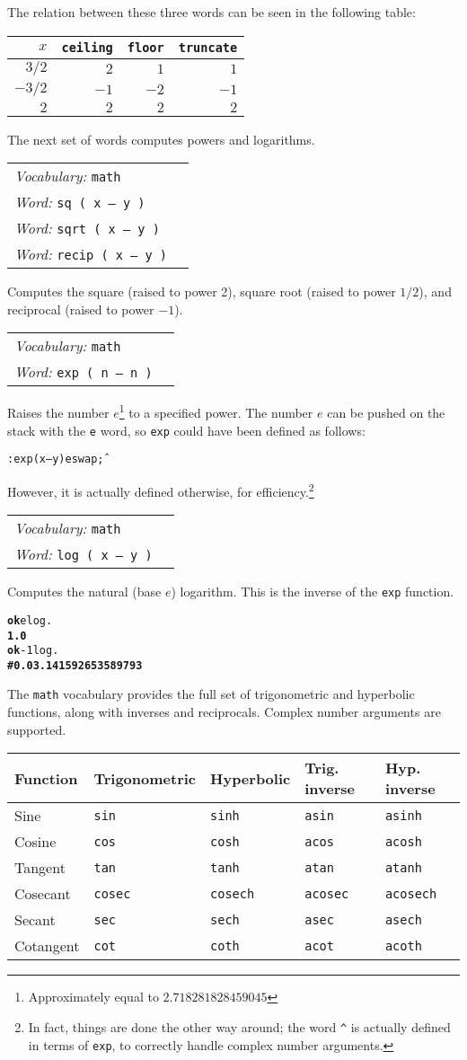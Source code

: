 \documentclass{book}
\newcommand{\tto}{\symbol{123}}
\newcommand{\ttc}{\symbol{125}}
\newcommand{\vocabulary}[1]{\emph{Vocabulary:} \texttt{#1}&\\}
\newcommand{\ordinaryword}[2]{\index{\texttt{#1}}\emph{Word:} \texttt{#2}&\\}
\newcommand{\wordtable}[1]{


\begin{tabularx}{12cm}{lX}
\hline
#1
\hline
\end{tabularx}

}
\begin{document}
The relation between these three words can be seen in the following table:

\begin{tabular}{r|r|r|r}
$x$&\verb|ceiling|&\verb|floor|&\verb|truncate|\\
\hline
$3/2$&$2$&$1$&$1$\\
$-3/2$&$-1$&$-2$&$-1$\\
$2$&$2$&$2$&$2$
\end{tabular}

The next set of words computes powers and logarithms.

\wordtable{
\vocabulary{math}
\ordinaryword{sq}{sq ( x -- y )}
\ordinaryword{sqrt}{sqrt ( x -- y )}
\ordinaryword{recip}{recip ( x -- y )}
}
Computes the square (raised to power 2), square root (raised to power $1/2$), and reciprocal (raised to power $-1$).
\wordtable{
\vocabulary{math}
\ordinaryword{exp}{exp ( n -- n )}
}
Raises the number $e$\footnote{Approximately equal to $2.718281828459045$} to a specified power. The number $e$ can be pushed on the stack with the \texttt{e} word, so \texttt{exp} could have been defined as follows:

\begin{alltt}
: exp ( x -- y ) e swap \^ ;
\end{alltt}

However, it is actually defined otherwise, for efficiency.\footnote{In fact, things are done the other way around; the word \texttt{\^{}} is actually defined in terms of \texttt{exp}, to correctly handle complex number arguments.}
\wordtable{
\vocabulary{math}
\ordinaryword{log}{log ( x -- y )}
}
Computes the natural (base $e$) logarithm. This is the inverse of the \texttt{exp} function.
\begin{alltt}
\textbf{ok} e log .
\textbf{1.0}
\textbf{ok} -1 log .
\textbf{\#\tto 0.0 3.141592653589793 \ttc}
\end{alltt}
The \texttt{math} vocabulary provides the full set of trigonometric and hyperbolic functions, along with inverses and reciprocals. Complex number arguments are supported.

\begin{tabular}{l|l|l|l|l}
Function&Trigonometric&Hyperbolic&Trig. inverse&Hyp. inverse\\
\hline
Sine&\texttt{sin}&\texttt{sinh}&\texttt{asin}&\texttt{asinh}\\
Cosine&\texttt{cos}&\texttt{cosh}&\texttt{acos}&\texttt{acosh}\\
Tangent&\texttt{tan}&\texttt{tanh}&\texttt{atan}&\texttt{atanh}\\
\hline
Cosecant&\texttt{cosec}&\texttt{cosech}&\texttt{acosec}&\texttt{acosech}\\
Secant&\texttt{sec}&\texttt{sech}&\texttt{asec}&\texttt{asech}\\
Cotangent&\texttt{cot}&\texttt{coth}&\texttt{acot}&\texttt{acoth}
\end{tabular}
\end{document}
